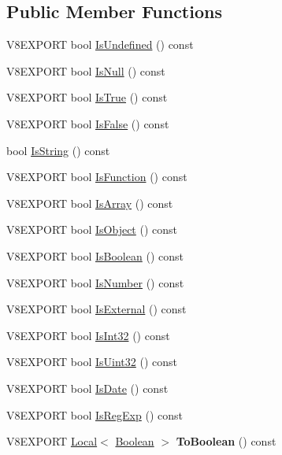 \subsection*{Public Member Functions}
\begin{DoxyCompactItemize}
\item 
V8\+E\+X\+P\+O\+R\+T bool \hyperlink{classv8_1_1_value_adeeae3576aecadc4176f94a415a70a90}{Is\+Undefined} () const 
\item 
V8\+E\+X\+P\+O\+R\+T bool \hyperlink{classv8_1_1_value_a0757712320a9bcfe5fc0a099524d986f}{Is\+Null} () const 
\item 
V8\+E\+X\+P\+O\+R\+T bool \hyperlink{classv8_1_1_value_ae93277798682f4be9adc204a16c40591}{Is\+True} () const 
\item 
V8\+E\+X\+P\+O\+R\+T bool \hyperlink{classv8_1_1_value_a265c208159ff3163ecda1e9f71b99115}{Is\+False} () const 
\item 
bool \hyperlink{classv8_1_1_value_ab23a34b7df62806808e01b0908bf5f00}{Is\+String} () const 
\item 
V8\+E\+X\+P\+O\+R\+T bool \hyperlink{classv8_1_1_value_a33f329c93a9f417e2d05b438e6e5429c}{Is\+Function} () const 
\item 
V8\+E\+X\+P\+O\+R\+T bool \hyperlink{classv8_1_1_value_a95c39ad189c09630dd90ee5c1a7e89a1}{Is\+Array} () const 
\item 
V8\+E\+X\+P\+O\+R\+T bool \hyperlink{classv8_1_1_value_a360f1fe4a8ee74382f571a12eb14a222}{Is\+Object} () const 
\item 
V8\+E\+X\+P\+O\+R\+T bool \hyperlink{classv8_1_1_value_a6baff625780eac51413f2392250e81be}{Is\+Boolean} () const 
\item 
V8\+E\+X\+P\+O\+R\+T bool \hyperlink{classv8_1_1_value_a32003b217768f535a4728bbd16ebd7d5}{Is\+Number} () const 
\item 
V8\+E\+X\+P\+O\+R\+T bool \hyperlink{classv8_1_1_value_a7aed90ede9bf48b10f18cdb97d50fd1e}{Is\+External} () const 
\item 
V8\+E\+X\+P\+O\+R\+T bool \hyperlink{classv8_1_1_value_a70d4afaccc7903e6a01f40a46ad04188}{Is\+Int32} () const 
\item 
V8\+E\+X\+P\+O\+R\+T bool \hyperlink{classv8_1_1_value_a2674a47b2550eb456a7ecfaf09d2f97e}{Is\+Uint32} () const 
\item 
V8\+E\+X\+P\+O\+R\+T bool \hyperlink{classv8_1_1_value_abcdd87539238a68f8337bae7d0a9c1ac}{Is\+Date} () const 
\item 
V8\+E\+X\+P\+O\+R\+T bool \hyperlink{classv8_1_1_value_a36ba10231b5aaf6c63d8589cd53c9a73}{Is\+Reg\+Exp} () const 
\item 
\hypertarget{classv8_1_1_value_adb0df6e857c07ae754b032307d3b5dbe}{}V8\+E\+X\+P\+O\+R\+T \hyperlink{classv8_1_1_local}{Local}$<$ \hyperlink{classv8_1_1_boolean}{Boolean} $>$ {\bfseries To\+Boolean} () const \label{classv8_1_1_value_adb0df6e857c07ae754b032307d3b5dbe}


\end{DoxyCompactItemize}
